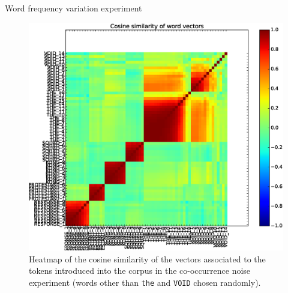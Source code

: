 \documentclass{article} %
\newcommand{\word}[1]{\texttt{#1}}
\begin{document}
\begin{section}{Word frequency variation experiment}
\begin{figure}
	\includegraphics[scale=0.5]{word-frequency-experiment-heatmap}
	\caption{
	Heatmap of the cosine similarity of the vectors associated to the
	tokens introduced into the corpus in the co-occurrence noise experiment
	(words other than \word{the} and \word{VOID} chosen randomly).
	}
	\label{word-frequency-experiment-heatmap}
\end{figure}

\begin{table}
	
	\caption{
	The most similar words in the original vocabulary to the tokens
	introduced into the corpus associated to the word \word{the},
	and their cosine similarity with the most frequent such token,
	\word{THE\_1}.  It is apparent from the nearest neigbours that
	the word vectors of the low frequency tokens have not been
	adequately trained (there were inadequate samples).
	}
	\label{word-frequency-experiment-cosine-similarity}
\end{table}


\end{section}
\end{document}
